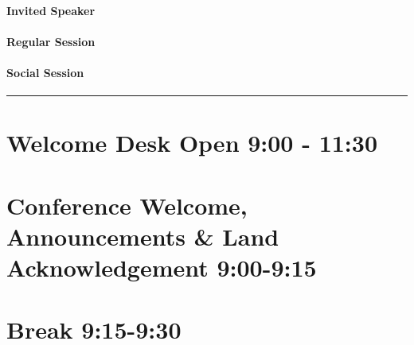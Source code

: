 \documentclass[
]{book}
\begin{document}
\begin{speaker}
\hypertarget{invited-speaker}{%
\paragraph{Invited Speaker}\label{invited-speaker}}
\end{speaker}

\begin{session}
\hypertarget{regular-session}{%
\paragraph{Regular Session}\label{regular-session}}
\end{session}
\begin{social}
\hypertarget{social-session}{%
\paragraph{Social Session}\label{social-session}}
\end{social}

\begin{center}\rule{0.5\linewidth}{0.5pt}\end{center}

\hypertarget{welcome-desk-open-900---1130-1}{%
\section*{Welcome Desk Open \textbar{} 9:00 - 11:30}\label{welcome-desk-open-900---1130-1}}

\hypertarget{conference-welcome-announcements-land-acknowledgement-900-915-1}{%
\section*{Conference Welcome, Announcements \& Land Acknowledgement \textbar{} 9:00-9:15}\label{conference-welcome-announcements-land-acknowledgement-900-915-1}}

\hypertarget{break-915-930-1}{%
\section*{Break \textbar{} 9:15-9:30}\label{break-915-930-1}}
\end{document}
